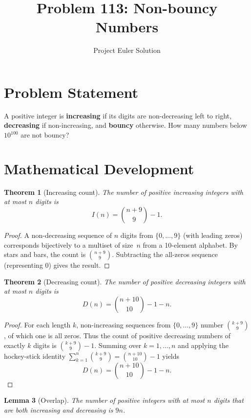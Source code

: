\documentclass[12pt]{article}
\title{Problem 113: Non-bouncy Numbers}
\author{Project Euler Solution}
\date{}
\newtheorem{theorem}{Theorem}
\newtheorem{lemma}[theorem]{Lemma}
\begin{document}
\maketitle

\section{Problem Statement}

A positive integer is \textbf{increasing} if its digits are non-decreasing left to right, \textbf{decreasing} if non-increasing, and \textbf{bouncy} otherwise. How many numbers below $10^{100}$ are not bouncy?

\section{Mathematical Development}

\begin{theorem}[Increasing count]
The number of positive increasing integers with at most $n$ digits is
\[
I(n) = \binom{n+9}{9} - 1.
\]
\end{theorem}

\begin{proof}
A non-decreasing sequence of $n$ digits from $\{0,\ldots,9\}$ (with leading zeros) corresponds bijectively to a multiset of size~$n$ from a 10-element alphabet. By stars and bars, the count is $\binom{n+9}{9}$. Subtracting the all-zeros sequence (representing 0) gives the result.
\end{proof}

\begin{theorem}[Decreasing count]
The number of positive decreasing integers with at most $n$ digits is
\[
D(n) = \binom{n+10}{10} - 1 - n.
\]
\end{theorem}

\begin{proof}
For each length $k$, non-increasing sequences from $\{0,\ldots,9\}$ number $\binom{k+9}{9}$, of which one is all zeros. Thus the count of positive decreasing numbers of exactly $k$ digits is $\binom{k+9}{9} - 1$. Summing over $k = 1,\ldots,n$ and applying the hockey-stick identity $\sum_{k=1}^{n}\binom{k+9}{9} = \binom{n+10}{10} - 1$ yields
\[
D(n) = \binom{n+10}{10} - 1 - n.
\]
\end{proof}

\begin{lemma}[Overlap]
The number of positive integers with at most $n$ digits that are both increasing and decreasing is $9n$.
\end{lemma}
\end{document}
